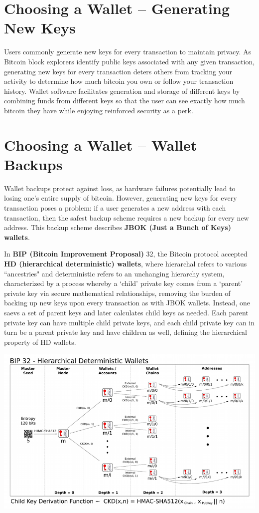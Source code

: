 \documentclass[full.tex]{subfiles}
\begin{document}
    \section*{Choosing a Wallet -- Generating New Keys}
    
    Users commonly generate new keys for every transaction to maintain privacy. As Bitcoin block explorers identify public keys associated with any given transaction, generating new keys for every transaction deters others from tracking your activity to determine how much bitcoin you own or follow your transaction history. Wallet software facilitates generation and storage of different keys by combining funds from different keys so that the user can see exactly how much bitcoin they have while enjoying reinforced security as a perk.
    
    \section*{Choosing a Wallet -- Wallet Backups}
    
    Wallet backups protect against loss, as hardware failures potentially lead to losing one's entire supply of bitcoin. However, generating new keys for every transaction poses a problem: if a user generates a new address with each transaction, then the safest backup scheme requires a new backup for every new address. This backup scheme describes \textbf{JBOK (Just a Bunch of Keys) wallets}.
    
    In \textbf{BIP (Bitcoin Improvement Proposal)} 32, the Bitcoin protocol accepted \textbf{HD (hierarchical deterministic) wallets}, where hierarchal refers to various ``ancestries" and deterministic refers to an unchanging hierarchy system, characterized by a process whereby a `child' private key comes from a `parent' private key via secure mathematical relationships, removing the burden of backing up new keys upon every transaction as with JBOK wallets. Instead, one saevs a set of parent keys and later calculates child keys as needed. Each parent private key can have multiple child private keys, and each child private key can in turn be a parent private key and have children as well, defining the hierarchical property of HD wallets.  

   \includegraphics[scale=3.5]{bip32}
   
\end{document}
